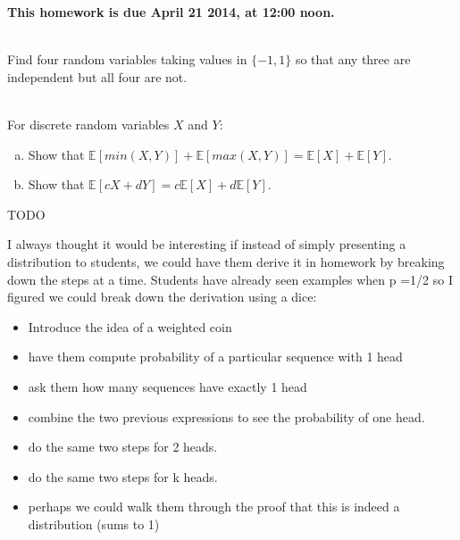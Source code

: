 \documentclass[]{article}
\newif\ifsolutions
\renewcommand{\answer}[1]{{\color{mydarkblue}\textbf{Solution:}#1}}
\begin{document}
\maketitle
{}
\vspace{0.5em}
{\Large{\textbf{This homework is due April 21 2014, at 12:00 noon.}}}

\begin{qunlist}

\\
Find four random variables taking values in $\{-1,1\}$ so that any three are independent but all four are not.

\ifsolutions{ \answer{
Let $X_1,X_2,X_3,X_4$ be i.i.d random variables with $P(X_i=1)=P(X_i=-1)=1/2$. Let $X_4=X_1X_2X_3$. Check that $X_1,X_2,X_3,X_4$ are four random variables such that any three are independent but all four are not. For example, they are not all independent because
\[
P(X_1=1,X_2=1,X_3=1,X_4=1)=1/8 \neq
P(X_1=1)P(X_2=1)P(X_3=1)P(X_4=1)
\]
}}
\fi

 \\ For discrete random variables $X$ and $Y$:

\begin{enumerate}[a)]
\qpart
\item Show that $\mathbb{E}[min(X,Y)] + \mathbb{E}[max(X,Y)] = \mathbb{E}[X] + \mathbb{E}[Y]$.


\qpart
\item Show that $\mathbb{E}[cX + dY] = c\mathbb{E}[X] + d \mathbb{E}[Y]$.

\end{enumerate}


TODO
  

I always thought it would be interesting if instead of simply presenting a distribution to students, we could have them derive it in homework by breaking down the steps at a time. Students have already seen examples when p =1/2 so I figured we could break down the derivation using a dice:
\begin{itemize}
\item Introduce the idea of a weighted coin
\item have them compute probability of a particular sequence with 1 head
\item ask them how many sequences have exactly 1 head
\item combine the two previous expressions to see the probability of one head.
\item do the same two steps for 2 heads.
\item do the same two steps for k heads.
\item perhaps we could walk them through the proof that this is indeed a distribution (sums to 1)
\end{itemize}


\end{qunlist}
\end{document}
